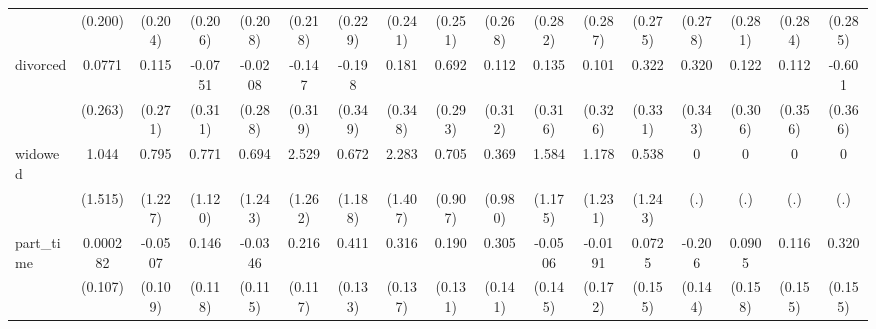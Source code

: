 {\begin{tabular}{l*{16}{c}}
                    &     (0.200)         &     (0.204)         &     (0.206)         &     (0.208)         &     (0.218)         &     (0.229)         &     (0.241)         &     (0.251)         &     (0.268)         &     (0.282)         &     (0.287)         &     (0.275)         &     (0.278)         &     (0.281)         &     (0.284)         &     (0.285)         \\
[1em]
divorced            &      0.0771         &       0.115         &     -0.0751         &     -0.0208         &      -0.147         &      -0.198         &       0.181         &       0.692\sym{*}  &       0.112         &       0.135         &       0.101         &       0.322         &       0.320         &       0.122         &       0.112         &      -0.601         \\
                    &     (0.263)         &     (0.271)         &     (0.311)         &     (0.288)         &     (0.319)         &     (0.349)         &     (0.348)         &     (0.293)         &     (0.312)         &     (0.316)         &     (0.326)         &     (0.331)         &     (0.343)         &     (0.306)         &     (0.356)         &     (0.366)         \\
[1em]
widowed             &       1.044         &       0.795         &       0.771         &       0.694         &       2.529\sym{*}  &       0.672         &       2.283         &       0.705         &       0.369         &       1.584         &       1.178         &       0.538         &           0         &           0         &           0         &           0         \\
                    &     (1.515)         &     (1.227)         &     (1.120)         &     (1.243)         &     (1.262)         &     (1.188)         &     (1.407)         &     (0.907)         &     (0.980)         &     (1.175)         &     (1.231)         &     (1.243)         &         (.)         &         (.)         &         (.)         &         (.)         \\
[1em]
part\_time           &    0.000282         &     -0.0507         &       0.146         &     -0.0346         &       0.216         &       0.411\sym{**} &       0.316\sym{*}  &       0.190         &       0.305\sym{*}  &     -0.0506         &     -0.0191         &      0.0725         &      -0.206         &      0.0905         &       0.116         &       0.320\sym{*}  \\
                    &     (0.107)         &     (0.109)         &     (0.118)         &     (0.115)         &     (0.117)         &     (0.133)         &     (0.137)         &     (0.131)         &     (0.141)         &     (0.145)         &     (0.172)         &     (0.155)         &     (0.144)         &     (0.158)         &     (0.155)         &     (0.155)         \\

\end{tabular}}
